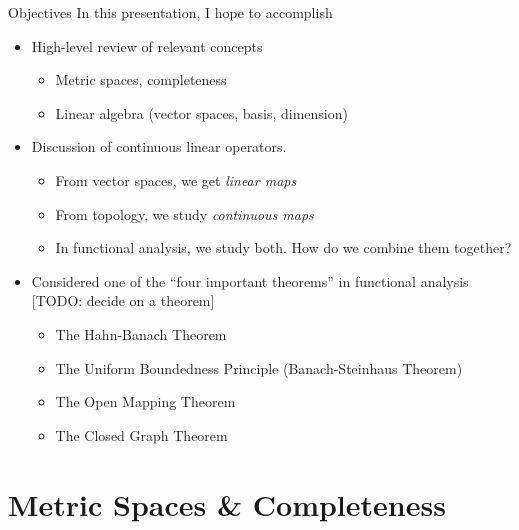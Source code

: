 \documentclass[10pt]{beamer}
\begin{document}
    \begin{frame}{Objectives}
        In this presentation, I hope to accomplish
        \begin{itemize}
            \item High-level review of relevant concepts 
            \begin{itemize}
                \item Metric spaces, completeness 
                \item Linear algebra (vector spaces, basis, dimension)
            \end{itemize}

            \item Discussion of \alert{continuous linear operators}. 
            \begin{itemize}
                \item From vector spaces, we get \emph{linear maps}
                \item From topology, we study \emph{continuous maps}
                \item In functional analysis, we study both. How do we combine them together?
            \end{itemize}
        \end{itemize}

        \begin{itemize}
            \item Considered one of the ``four important theorems'' in functional analysis [TODO: decide on a theorem]
            \begin{itemize}
                \item The Hahn-Banach Theorem
                \item The Uniform Boundedness Principle (Banach-Steinhaus Theorem)
                \item The Open Mapping Theorem
                \item The Closed Graph Theorem
            \end{itemize}
        \end{itemize}
    \end{frame}

    \section{Metric Spaces \& Completeness}
\end{document}
